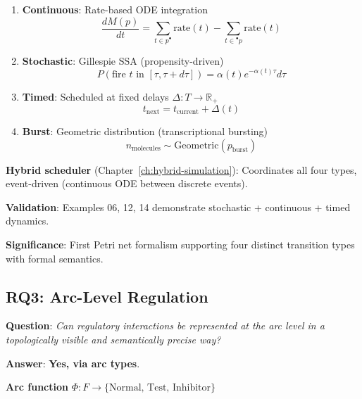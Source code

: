 \begin{enumerate}
    \item \textbf{Continuous}: Rate-based ODE integration
    \begin{equation}
    \frac{dM(p)}{dt} = \sum_{t \in p^\bullet} \text{rate}(t) - \sum_{t \in {}^\bullet p} \text{rate}(t)
    \end{equation}
    
    \item \textbf{Stochastic}: Gillespie SSA (propensity-driven)
    \begin{equation}
    P(\text{fire } t \text{ in } [\tau, \tau+d\tau]) = \alpha(t) e^{-\alpha(t)\tau} d\tau
    \end{equation}
    
    \item \textbf{Timed}: Scheduled at fixed delays $\Delta: T \to \mathbb{R}_+$
    \begin{equation}
    t_{\text{next}} = t_{\text{current}} + \Delta(t)
    \end{equation}
    
    \item \textbf{Burst}: Geometric distribution (transcriptional bursting)
    \begin{equation}
    n_{\text{molecules}} \sim \text{Geometric}(p_{\text{burst}})
    \end{equation}
\end{enumerate}

\textbf{Hybrid scheduler} (Chapter~\ref{ch:hybrid-simulation}): Coordinates all four types, event-driven (continuous ODE between discrete events).

\textbf{Validation}: Examples 06, 12, 14 demonstrate stochastic + continuous + timed dynamics.

\textbf{Significance}: First Petri net formalism supporting four distinct transition types with formal semantics.

\subsection{RQ3: Arc-Level Regulation}
\label{subsec:rq3}

\textbf{Question}: \textit{Can regulatory interactions be represented at the arc level in a topologically visible and semantically precise way?}

\textbf{Answer}: \textbf{Yes, via arc types}.

\textbf{Arc function} $\Phi: F \to \{\text{Normal, Test, Inhibitor}\}$

